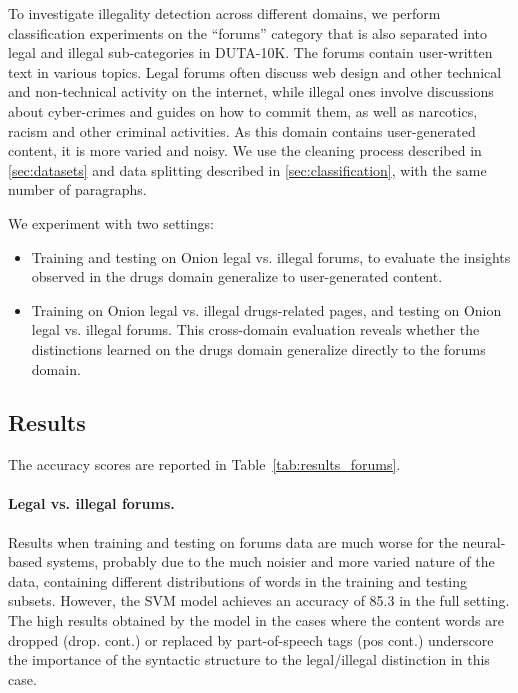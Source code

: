 \documentclass[11pt,a4paper,table]{article}
\begin{document}
To investigate illegality detection across different domains, %
we perform classification experiments on the  ``forums'' category that is also separated into legal and illegal sub-categories in DUTA-10K.
The forums  contain user-written text in various topics. Legal forums often discuss web design and other technical
and non-technical activity on the internet, while illegal ones involve
discussions about cyber-crimes and guides on how to commit them,
as well as narcotics, racism and other criminal activities.
As this domain contains user-generated content, it is more varied
and noisy. We use the cleaning process described in \ref{sec:datasets} and data splitting described in \ref{sec:classification}, with the same number of paragraphs.

We experiment with two settings:
\begin{itemize}
\item Training and testing on Onion legal vs. illegal forums,
to evaluate the insights observed in the drugs domain generalize to user-generated content.
\item Training on Onion legal vs. illegal drugs-related pages,
and testing on Onion legal vs. illegal forums.
This cross-domain evaluation reveals whether the distinctions learned on the
drugs domain generalize directly to the forums domain.
\end{itemize}  

\subsection{Results}

The accuracy scores are reported in Table~\ref{tab:results_forums}.

\paragraph{Legal vs. illegal forums.}

Results when training and testing on forums data are much worse for the neural-based systems,
probably due to the much noisier and more varied nature of the data,
containing different distributions of words in the training and testing
subsets. However, the SVM model achieves an accuracy of 85.3 in the full setting. The high results obtained by the model in the cases where the content words are dropped (drop. cont.) or replaced by part-of-speech tags (pos cont.) underscore the importance of the syntactic structure to the legal/illegal distinction in this case. 
\end{document}
